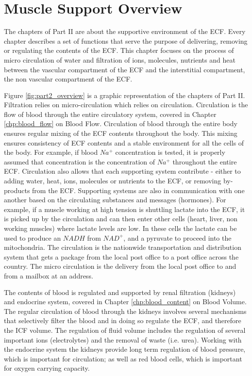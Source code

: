 \section{Muscle Support Overview}

The chapters of Part II are about the supportive environment of the ECF. Every chapter describes a set of functions that serve the purpose of delivering, removing or regulating the contents of the ECF. This chapter focuses on the process of micro circulation of water and filtration of ions, molecules, nutrients and heat between the  vascular compartment of the ECF and the interstitial compartment, the non vascular compartment of the ECF.  

Figure \ref{fig:part2_overview} is a graphic representation of the chapters of Part II. Filtration relies on micro-circulation which relies on circulation. Circulation is the flow of blood through the entire circulatory system, covered in Chapter \ref{chp:blood_flow} on Blood Flow. Circulation of blood through the entire body ensures regular mixing of the ECF contents throughout the body. This mixing ensures consistency of ECF contents and a stable environment for all the cells of the body. For example, if blood $Na^+$ concentration is tested, it is properly assumed that concentration is the concentration of $Na^+$ throughout the entire ECF. Circulation also allows that each supporting system contribute - either to adding water, heat, ions, molecules or nutrients to the ECF, or removing by-products from the ECF. Supporting systems are also in communication with one another based on the circulating substances and messages (hormones). For example, if a muscle working at high tension is shuttling lactate into the ECF, it is picked up by the circulation and can then enter other cells (heart, liver, non working muscles) where lactate levels are low. In these cells the lactate can be used to produce an $NADH$ from $NAD^+$, and a pyruvate to proceed into the mitochondria. The circulation is the nationwide transportation and distribution system that gets a package from the local post office to a post office across the country. The micro circulation is the delivery from the local post office to and from a mailbox at an address.

The contents of blood is regulated and supported by renal filtration (kidneys) and endocrine system, covered in Chapter \ref{chp:blood_content} on Blood Volume. The regular circulation of blood through the kidneys involves several mechanisms that selectively filter the blood and in doing so regulate the ECF, and therefore the ICF volume. The regulation of fluid volume includes the regulation of several important ions (electrolytes) and the removal of waste (i.e. urea). Working with the endocrine system the kidneys provide long term regulation of blood pressure, which is important for circulation; as well as red blood cells, which is important for oxygen carrying capacity.


